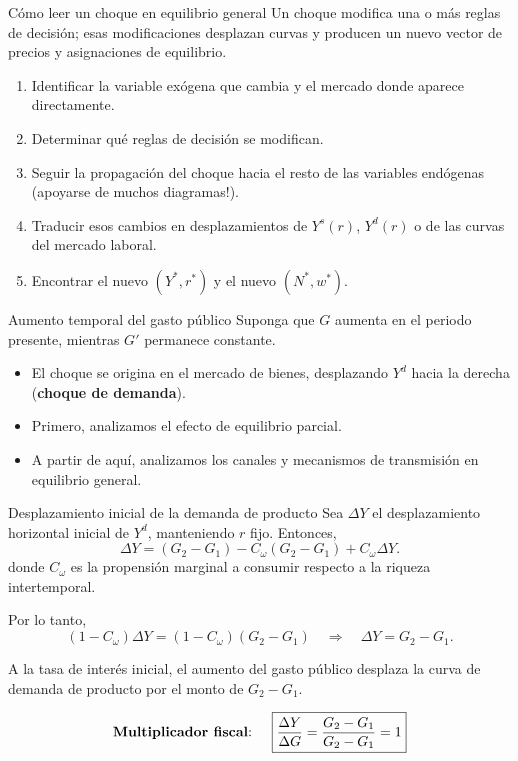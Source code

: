 \documentclass[aspectratio=169,11pt]{beamer}
\begin{document}
\begin{frame}{Cómo leer un choque en equilibrio general}
  Un choque modifica una o más reglas de decisión; esas modificaciones desplazan curvas y producen un nuevo vector de precios y asignaciones de equilibrio.
  \vspace{.2cm}
  \begin{enumerate}
    \setlength{\itemsep}{0.55em}
    \item Identificar la variable exógena que cambia y el mercado donde aparece directamente.
    \item Determinar qué reglas de decisión se modifican.
    \item Seguir la propagación del choque hacia el resto de las variables endógenas (apoyarse de muchos diagramas!).
    \item Traducir esos cambios en desplazamientos de \(Y^s(r)\), \(Y^d(r)\) o de las curvas del mercado laboral.
    \item Encontrar el nuevo \((Y^*,r^*)\) y el nuevo \((N^*,w^*)\).
  \end{enumerate}
\end{frame}

\begin{frame}{Aumento temporal del gasto público}
  Suponga que \(G\) aumenta en el periodo presente, mientras \(G'\) permanece constante.
  \begin{itemize}
    \setlength{\itemsep}{0.48em}
    \item El choque se origina en el mercado de bienes, desplazando $Y^d$ hacia la derecha (\textbf{choque de demanda}).
    \item Primero, analizamos el efecto de equilibrio parcial.
    \item A partir de aquí, analizamos los canales y mecanismos de transmisión en equilibrio general.
  \end{itemize}
\end{frame}

\begin{frame}{Desplazamiento inicial de la demanda de producto}
  Sea \(\Delta Y\) el desplazamiento horizontal inicial de \(Y^d\), manteniendo \(r\) fijo. Entonces,
  \[
    \Delta Y
    =
    (G_2 - G_1) -  C_\omega (G_2 - G_1) + C_\omega \Delta Y.
  \]
  donde $C_\omega$ es la propensión marginal a consumir respecto a la riqueza intertemporal.


  Por lo tanto,
  \[
    (1 - C_\omega) \Delta Y=(1 - C_\omega)(G_2 - G_1)
    \quad\Longrightarrow\quad
    \boxed{\Delta Y = G_2 - G_1}.
  \]


  A la tasa de interés inicial, el aumento del gasto público desplaza la curva de demanda de producto por el monto de \(G_2 - G_1\).

  \small

  $$
  \text{\textbf{Multiplicador fiscal}: } \quad 
  \boxed{
  \frac{\Delta Y}{\Delta G} = \frac{G_2 - G_1}{G_2 - G_1} = 1
  }
  $$
\end{frame}
\end{document}
